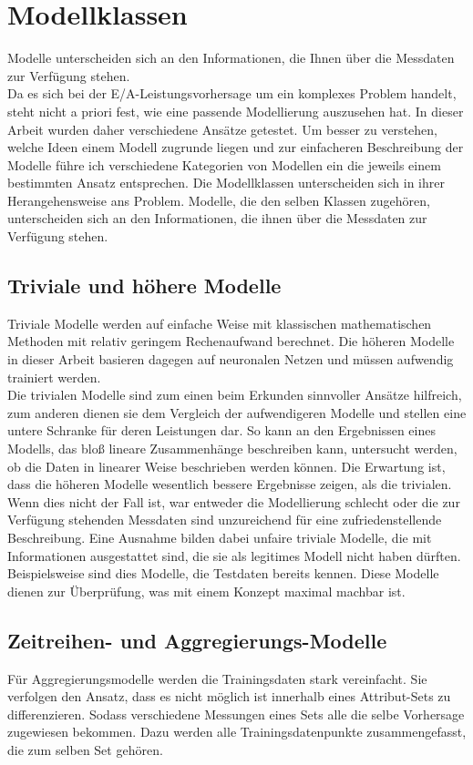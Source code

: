 \documentclass[
	12pt,
	a4paper,
	BCOR10mm,
	DIV14,
	listof=totoc,
	bibliography=totoc,
	headsepline
]{scrreprt}
\begin{document}
\section{Modellklassen}
Modelle unterscheiden sich an den Informationen, die Ihnen über die Messdaten zur Verfügung stehen.\\

Da es sich bei der E/A-Leistungsvorhersage um ein komplexes Problem handelt, steht nicht a priori fest, wie eine passende Modellierung auszusehen hat. 
In dieser Arbeit wurden daher verschiedene Ansätze getestet. Um besser zu verstehen, welche Ideen einem Modell zugrunde liegen und zur einfacheren Beschreibung der Modelle führe ich verschiedene Kategorien von Modellen ein die jeweils einem bestimmten Ansatz entsprechen.
Die Modellklassen unterscheiden sich in ihrer Herangehensweise ans Problem. Modelle, die den selben Klassen zugehören, unterscheiden sich an den Informationen, die ihnen über die Messdaten zur Verfügung stehen.

\subsection{Triviale und höhere Modelle}
Triviale Modelle werden auf einfache Weise mit klassischen mathematischen Methoden mit relativ geringem Rechenaufwand berechnet. Die höheren Modelle in dieser Arbeit basieren dagegen auf neuronalen Netzen und müssen aufwendig trainiert werden.\\
Die trivialen Modelle sind zum einen beim Erkunden sinnvoller Ansätze hilfreich, zum anderen dienen sie dem Vergleich der aufwendigeren Modelle und stellen eine untere Schranke für deren Leistungen dar. So kann an den Ergebnissen eines Modells, das bloß lineare Zusammenhänge beschreiben kann, untersucht werden, ob die Daten in linearer Weise beschrieben werden können. Die Erwartung ist, dass die höheren Modelle wesentlich bessere Ergebnisse zeigen, als die trivialen. Wenn dies nicht der Fall ist, war entweder die Modellierung schlecht oder die zur Verfügung stehenden Messdaten sind unzureichend für eine zufriedenstellende Beschreibung.
Eine Ausnahme bilden dabei unfaire triviale Modelle, die mit Informationen ausgestattet sind, die sie als legitimes Modell nicht haben dürften. Beispielsweise sind dies Modelle, die Testdaten bereits kennen. Diese Modelle dienen zur Überprüfung, was mit einem Konzept maximal machbar ist.

\subsection{Zeitreihen- und Aggregierungs-Modelle}
Für Aggregierungsmodelle werden die Trainingsdaten stark vereinfacht. Sie verfolgen den Ansatz, dass es nicht möglich ist innerhalb eines Attribut-Sets zu differenzieren. Sodass verschiedene Messungen eines Sets alle die selbe Vorhersage zugewiesen bekommen. Dazu werden alle Trainingsdatenpunkte zusammengefasst, die zum selben Set gehören.
\end{document}
